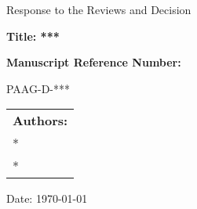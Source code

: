 \begin{titlepage}
\centering
{\LARGE Response to the Reviews and Decision \par}
\vspace{1.5cm}

{\large \bfseries Title: ***	 \par}
\vspace{1.5cm}

    {\large \bfseries Manuscript Reference Number: \par
    PAAG-D-***}
\vspace{1.5cm}

\begin{table}[h!]
\renewcommand{\arraystretch}{1}
\centering
\begin{tabular}{lc}
\multicolumn{2}{c}{\large \bfseries Authors:} \\
\large ** \\
\large **  \\
\end{tabular}
\end{table}
\vspace{1.5cm}
\large Date: \today

\end{titlepage}
